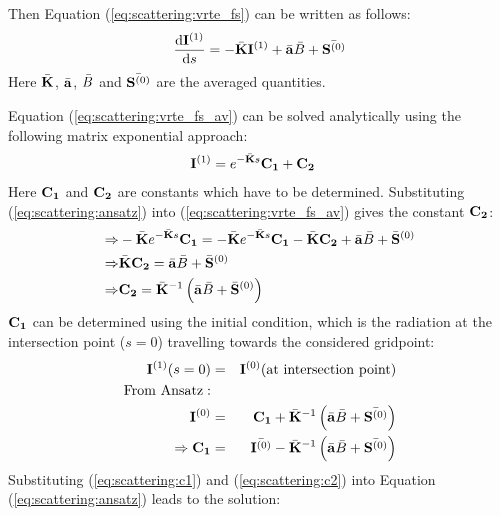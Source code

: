 Then Equation (\ref{eq:scattering:vrte_fs}) can be written as follows:
 \begin{eqnarray}
     \frac{\mathrm{d} {\bf I}^{(1)}}{\mathrm{d} s} =
     -\bar{{\bf K}} {\bf I}^{(1)} + \bar{{\bf a}} \bar{B}
     +\bar{{\bf S}^{(0)}}
\label{eq:scattering:vrte_fs_av}
\end{eqnarray} 
Here $\bar{{\bf K}}$, $\bar{{\bf a}}$, $\bar{B}$ and
$\bar{{\bf S}^{(0)}}$ are the averaged quantities.



Equation (\ref{eq:scattering:vrte_fs_av}) can be solved analytically using the following matrix exponential approach:
 \begin{eqnarray}
 \label{eq:scattering:ansatz}
&   {\bf I}^{(1)} = e^{-\bar{{\bf K}}s}{\bf C_1} + {\bf C_2}
\end{eqnarray}
Here ${\bf C_1}$ and ${\bf C_2}$ are constants which have to be determined. Substituting (\ref{eq:scattering:ansatz}) into (\ref{eq:scattering:vrte_fs_av}) gives the constant  ${\bf C_2}$:
\begin{eqnarray}
 \Rightarrow& -\bar{{\bf K}}e^{-\bar{{\bf K}}s}{\bf C_1} = -\bar{{\bf K}}e^{-\bar{{\bf K}}s}{\bf C_1} - \bar{{\bf K}} {\bf C_2}+ \bar{{\bf a}} \bar{B} +\bar{{\bf S}}^{(0)}\\
\Rightarrow&  \bar{{\bf K}} {\bf C_2} = \bar{{\bf a}} \bar{B} +\bar{{\bf S}}^{(0)}\\
\Rightarrow& {\bf C_2} =  \bar{{\bf K}}^{-1}\left(\bar{{\bf a}} \bar{B} +\bar{{\bf S}}^{(0)}\right)
 \label{eq:scattering:c1}
\end{eqnarray}
${\bf C_1}$ can be determined using the initial condition, which is the radiation at the intersection point ($s=0$) travelling towards the considered gridpoint:
\begin{eqnarray}
   \StoVec^{(1)}(s=0) &=& \StoVec^{(0)} {\rm(at\ intersection\ point)}\\
\rm{From\ Ansatz:} &&\\
\StoVec^{(0)} &=& {\bf C_1} +  \bar{\ExtMat}\Inv\left(\bar{\AbsVec} \bar{\Planck} +\bar{\ScaInt^{(0)}}\right)\\
\Rightarrow   {\bf C_1} &=& \bar{\StoVec^{(0)}} -  \bar{\ExtMat}\Inv \left(\bar{\AbsVec} \bar{\Planck} +\bar{\ScaInt^{(0)}}\right)
\label{eq:scattering:c2}
\end{eqnarray}
Substituting  (\ref{eq:scattering:c1}) and (\ref{eq:scattering:c2}) into Equation (\ref{eq:scattering:ansatz}) leads to the solution: 
